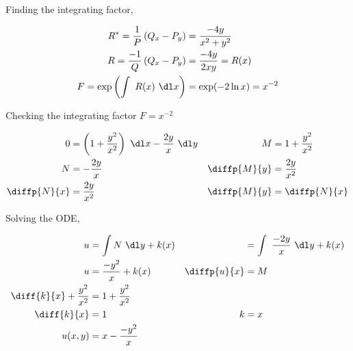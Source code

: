 \begin{enumerate}
\begin{enumerate}
                    Finding the integrating factor,

                    \begin{align}
                        R^{*} = \frac{1}{P} \left( Q_{x} - P_{y} \right)
                         & = \frac{-4y}{x^{2} + y^{2}} \\
                        R = \frac{-1}{Q}\left( Q_{x} - P_{y} \right)
                         & = \frac{-4y}{2xy} = R(x)    \\
                        F = \exp \left( \int\ R(x)\ \dl x \right)
                         & = \exp (-2\ln x) = x^{-2}
                    \end{align}

                    Checking the integrating factor $ F = x^{-2} $

                    \begin{align}
                        0            & = \left( 1 + \frac{y^{2}}{x^{2}} \right)
                        \ \dl x - \frac{2y}{x}\ \dl y
                                     &
                        M            & = 1 + \frac{y^{2}}{x^{2}}                  \\
                        N            & = - \frac{2y}{x}                         &
                        \diffp{M}{y} & = \frac{2y}{x^{2}}                         \\
                        \diffp{N}{x} & = \frac{2y}{x^{2}}                       &
                        \diffp{M}{y} & = \diffp{N}{x}
                    \end{align}

                    Solving the ODE,

                    \begin{align}
                        u            & = \int N\ \dl y+ k(x)              &
                                     & = \int\ \frac{-2y}{x}\ \dl y+ k(x)   \\
                        u            & = \frac{-y^{2}}{x} + k(x)          &
                        \diffp{u}{x} & = M                                  \\
                        \diff{k}{x} + \frac{y^{2}}{x^{2}}
                                     & = 1 + \frac{y^{2}}{x^{2}}            \\
                        \diff{k}{x}  & = 1                                &
                        k            & = x                                  \\
                        u(x, y)      & = x - \frac{-y^{2}}{x}
                    \end{align}


\end{enumerate}
\end{enumerate}
